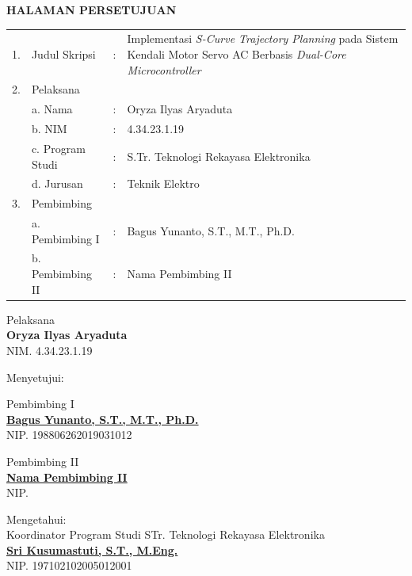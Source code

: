 \newpage
\begin{center}
    \textbf{\MakeUppercase{HALAMAN PERSETUJUAN}}
\end{center}
\vspace{0.5cm}

\noindent
\begin{tabular}{@{}p{0.5cm} p{3.2cm} p{0.2cm} p{9.5cm}@{}}
    1. & Judul Skripsi & : & Implementasi \textit{S-Curve Trajectory Planning} pada Sistem Kendali Motor Servo AC Berbasis \textit{Dual-Core Microcontroller} \\
    2. & Pelaksana & & \\
       & a. Nama & : & Oryza Ilyas Aryaduta \\
       & b. NIM & : & 4.34.23.1.19 \\
       & c. Program Studi & : & S.Tr. Teknologi Rekayasa Elektronika \\
       & d. Jurusan & : & Teknik Elektro \\
    3. & Pembimbing & & \\
       & a. Pembimbing I & : & Bagus Yunanto, S.T., M.T., Ph.D. \\
       & b. Pembimbing II & : & Nama Pembimbing II \\
\end{tabular}

\vspace{0.5cm}
\begin{flushright}
\end{flushright}


\vspace{0.5cm}
\noindent
\hfill
\begin{minipage}{0.4\textwidth}
    \centering
    Pelaksana \\
    \vspace{2cm}
    \textbf{Oryza Ilyas Aryaduta} \\
    NIM. 4.34.23.1.19
\end{minipage}

\vspace{0.5cm}
\noindent Menyetujui: \\[0.5cm]
\noindent
\begin{minipage}[t]{0.45\textwidth}
    \centering
    Pembimbing I \\
    \vspace{2.5cm}
    \underline{\textbf{Bagus Yunanto, S.T., M.T., Ph.D.}} \\
    NIP. 198806262019031012
\end{minipage}
\hfill
\begin{minipage}[t]{0.45\textwidth}
    \centering
    Pembimbing II \\
    \vspace{2.5cm}
    \underline{\textbf{Nama Pembimbing II}} \\
    NIP.
\end{minipage}

\vspace{1cm}
\begin{center}
    Mengetahui: \\
    Koordinator Program Studi STr. Teknologi Rekayasa Elektronika \\
    \vspace{2.5cm}
    \underline{\textbf{Sri Kusumastuti, S.T., M.Eng.}} \\
    NIP. 197102102005012001
\end{center}